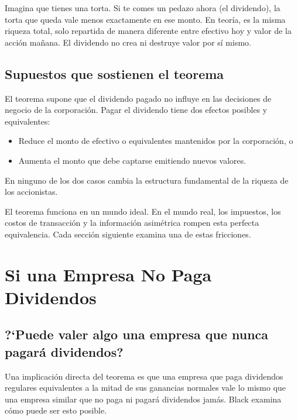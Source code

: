\documentclass[12pt]{article}
\begin{document}
\begin{intuicion}
Imagina que tienes una torta. Si te comes un pedazo ahora (el dividendo), la torta que queda vale menos exactamente en ese monto. En teor\'ia, es la misma riqueza total, solo repartida de manera diferente entre efectivo hoy y valor de la acci\'on ma\~nana. El dividendo no crea ni destruye valor por s\'i mismo.
\end{intuicion}

\subsection{Supuestos que sostienen el teorema}

El teorema supone que el dividendo pagado no influye en las decisiones de negocio de la corporaci\'on. Pagar el dividendo tiene dos efectos posibles y equivalentes:
\begin{itemize}
  \item Reduce el monto de efectivo o equivalentes mantenidos por la corporaci\'on, o
  \item Aumenta el monto que debe captarse emitiendo nuevos valores.
\end{itemize}
En ninguno de los dos casos cambia la estructura fundamental de la riqueza de los accionistas.

\begin{intuicion}
El teorema funciona en un mundo ideal. En el mundo real, los impuestos, los costos de transacci\'on y la informaci\'on asim\'etrica rompen esta perfecta equivalencia. Cada secci\'on siguiente examina una de estas fricciones.
\end{intuicion}

\section{Si una Empresa No Paga Dividendos}

\subsection{?`Puede valer algo una empresa que nunca pagar\'a dividendos?}

Una implicaci\'on directa del teorema es que una empresa que paga dividendos regulares equivalentes a la mitad de sus ganancias normales vale lo mismo que una empresa similar que no paga ni pagar\'a dividendos jam\'as. Black examina c\'omo puede ser esto posible.
\end{document}
